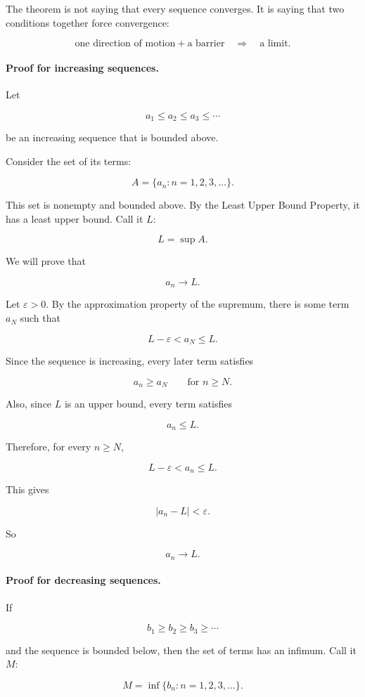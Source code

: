 The theorem is not saying that every sequence converges.  It is saying that two
conditions together force convergence:

\[
\boxed{
\text{one direction of motion}+\text{a barrier}
\quad\Longrightarrow\quad
\text{a limit.}
}
\]

\paragraph{Proof for increasing sequences.}
Let

\[
a_1\le a_2\le a_3\le\cdots
\]

be an increasing sequence that is bounded above.

Consider the set of its terms:

\[
A=\{a_n:n=1,2,3,\ldots\}.
\]

This set is nonempty and bounded above.  By the Least Upper Bound Property, it has a
least upper bound.  Call it \(L\):

\[
L=\sup A.
\]

We will prove that

\[
a_n\to L.
\]

Let \(\varepsilon>0\).  By the approximation property of the supremum, there is some
term \(a_N\) such that

\[
L-\varepsilon<a_N\le L.
\]

Since the sequence is increasing, every later term satisfies

\[
a_n\ge a_N
\qquad\text{for }n\ge N.
\]

Also, since \(L\) is an upper bound, every term satisfies

\[
a_n\le L.
\]

Therefore, for every \(n\ge N\),

\[
L-\varepsilon<a_n\le L.
\]

This gives

\[
|a_n-L|<\varepsilon.
\]

So

\[
a_n\to L.
\]

\paragraph{Proof for decreasing sequences.}
If

\[
b_1\ge b_2\ge b_3\ge\cdots
\]

and the sequence is bounded below, then the set of terms has an infimum.  Call it
\(M\):

\[
M=\inf\{b_n:n=1,2,3,\ldots\}.
\]

